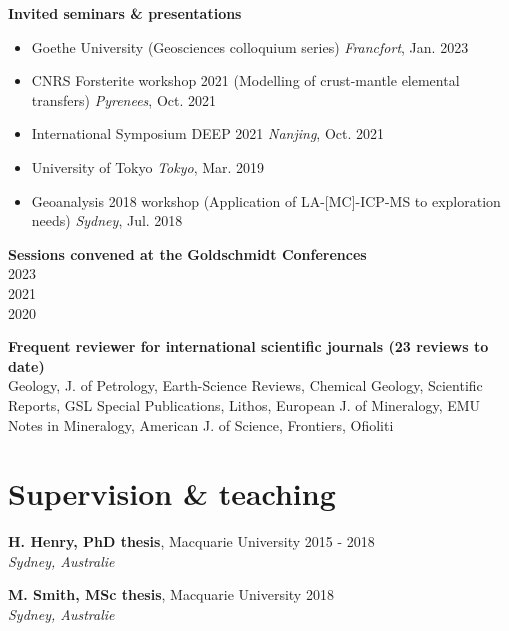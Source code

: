 \documentclass[a4paper,11pt]{article}
\begin{document}
    \textbf{Invited seminars \& presentations}
    \begin{itemize}[label={},itemsep=0pt,parsep=0pt]
        \item Goethe University (Geosciences colloquium series)
            \hfill \textit{Francfort}, {Jan. 2023}
        \item CNRS Forsterite workshop 2021 (Modelling of crust-mantle elemental transfers)
            \hfill \textit{Pyrenees}, {Oct. 2021}
        \item International Symposium DEEP 2021
            \hfill \textit{Nanjing}, {Oct. 2021}
        \item University of Tokyo
            \hfill \textit{Tokyo}, {Mar. 2019}
        \item Geoanalysis 2018 workshop (Application of LA-[MC]-ICP-MS to exploration needs)
            \hfill \textit{Sydney}, {Jul. 2018}
    \end{itemize}

    \textbf{Sessions convened at the Goldschmidt Conferences}\\
     \hfill {2023}\\
     \hfill {2021} \\
     \hfill {2020}
    
    \textbf{Frequent reviewer for international scientific journals (23 reviews to date)}\\
      Geology, J. of Petrology, Earth-Science Reviews, Chemical Geology, Scientific Reports, GSL Special Publications, Lithos, European J. of Mineralogy, EMU Notes in Mineralogy, American J. of Science, Frontiers, Ofioliti

\section{Supervision \& teaching}
    \textbf{H. Henry, PhD thesis}, Macquarie University
    \hfill {2015 - 2018}\\ 
    \hfill \textit{Sydney, Australie}

    \textbf{M. Smith, MSc thesis}, Macquarie University
    \hfill {2018}\\ 
    \hfill \textit{Sydney, Australie}
\end{document}
